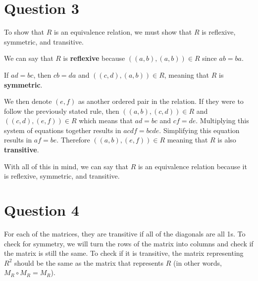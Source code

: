 \documentclass[11pt]{article}
\begin{document}
\section*{Question 3}
To show that $R$ is an equivalence relation, we must show that $R$ is reflexive, symmetric, and transitive.

We can say that $R$ is \textbf{reflexive} because $((a,b), (a,b)) \in R$ since $ab = ba$. 

If $ad = bc$, then $cb = da$ and $((c,d), (a,b)) \in R$, meaning that $R$ is \textbf{symmetric}.

We then denote $(e,f)$ as another ordered pair in the relation. If they were to follow the previously stated rule, then $((a,b), (c,d)) \in R$ and $((c,d), (e,f)) \in R$ which means that $ad = bc$ and $cf = de$. Multiplying this system of equations together results in $acdf = bcde$. Simplifying this equation results in $af = be$. Therefore $((a,b), (e,f)) \in R$ meaning that $R$ is also \textbf{transitive}.

With all of this in mind, we can say that $R$ is an equivalence relation because it is reflexive, symmetric, and transitive.

\section*{Question 4}
For each of the matrices, they are transitive if all of the diagonals are all 1s. To check for symmetry, we will turn the rows of the matrix into columns and check if the matrix is still the same. To check if it is transitive, the matrix representing $R^2$ should be the same as the matrix that represents $R$ (in other words, $M_R \circ M_R = M_R$).
\end{document}
